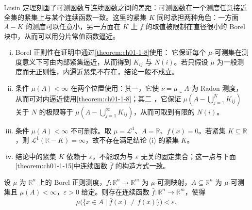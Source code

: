 \documentclass[../../main.tex]{subfiles}%
\begin{document}
\begin{remark}\label{remark:ch01-thm-1-14-动机}
Lusin 定理刻画了可测函数与连续函数之间的差距：可测函数在一个测度任意接近全集的紧集上与某个连续函数一致。这里的紧集 $K$ 同时承担两种角色：一方面 $A-K$ 的测度可以任意小，另一方面在 $K$ 上 $f$ 的取值被限制在直径很小的 Borel 块中，从而可以用分片常值函数逼近。
\end{remark}

\begin{remark}\label{remark:ch01-thm-1-14-条件}
\begin{enumerate}[(i)]
\item Borel 正则性在证明中通过\cref{theorem:ch01-1-8}使用： 它保证每个 $\mu$-可测集在测度意义下可由内部紧集逼近，从而得到 $K_{ij}$ 与 $N(i)$。若只假设 $\mu$ 为一般测度而无正则性，内逼近紧集不存在，结论一般不成立。 %
\item 条件 $\mu(A)<\infty$ 在两个位置使用：其一，它使 $\nu=\mu\llcorner A$ 为 Radon 测度，从而可对内逼近使用\cref{theorem:ch01-1-8}；其二 ，它保证 $\mu(A-\bigcup_{j=1}^{N}K_{ij})$ 关于 $N$ 的极限等于 $\mu(A-\bigcup_{j=1}^{\infty}K_{ij})$，从而可取到有限的 $N(i)$。 %
\item 条件 $\mu(A)<\infty$ 不可删除。取 $\mu=\mathcal{L}^1$、$A=\mathbb{R}$、$f(x)=0$。若紧集 $K\subseteq\mathbb{R}$，则 $\mathcal{L}^1(\mathbb{R}-K)=\infty$，故不存在满足结论 (i) 的紧集 $K$。
\item 结论中的紧集 $K$ 依赖于 $\varepsilon$，不能取为与 $\varepsilon$ 无关的固定集合；这一点与下面\cref{theorem:ch01-1-15}中连续函数 $\bar f$ 的构造方式一致。%
\end{enumerate}
\end{remark}

\begin{theorem}[连续函数逼近]\label{theorem:ch01-1-15}
设 $\mu$ 为 $\mathbb{R}^n$ 上的 Borel 正则测度，$f:\mathbb{R}^n\to\mathbb{R}^m$ 为 $\mu$-可测映射，$A\subseteq\mathbb{R}^n$ 为 $\mu$-可测集且 $\mu(A)<\infty$，$\varepsilon>0$ 给定。则存在连续函数 $\bar f:\mathbb{R}^n\to\mathbb{R}^m$，使得
\begin{align*}
\mu\bigl(\{x\in A\mid\bar f(x)\neq f(x)\}\bigr)<\varepsilon.
\end{align*}
\end{theorem}
\end{document}
